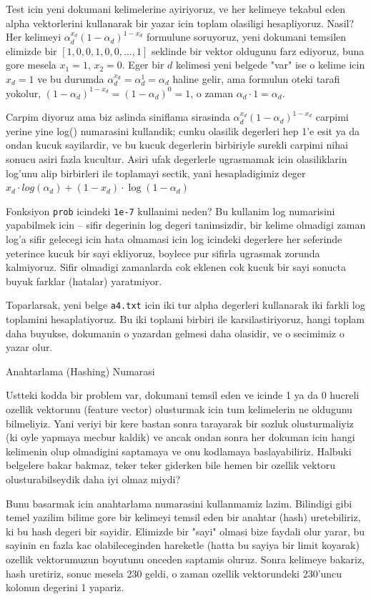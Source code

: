 \documentclass[12pt,fleqn]{article}\usepackage{../common}
\begin{document}
Test icin yeni dokumani kelimelerine ayiriyoruz, ve her kelimeye tekabul eden
alpha vektorlerini kullanarak bir yazar icin toplam olasiligi
hesapliyoruz. Nasil? Her kelimeyi $\alpha_d^{x_d}(1-\alpha_d)^{1-x_d}$ formulune
soruyoruz, yeni dokumani temsilen elimizde bir $[1,0,0,1,0,0,...,1]$ seklinde
bir vektor oldugunu farz ediyoruz, buna gore mesela $x_1=1$, $x_2=0$. Eger bir
$d$ kelimesi yeni belgede "var" ise o kelime icin $x_d = 1$ ve bu durumda
$\alpha_d^{x_d} = \alpha_d^{1} = \alpha_d$ haline gelir, ama formulun oteki
tarafi yokolur, $(1-\alpha_d)^{1-x_d} = (1-\alpha_d)^0 = 1$, o zaman $\alpha_d
\cdot 1 = \alpha_d$.

Carpim diyoruz ama biz aslinda siniflama sirasinda
$\alpha_d^{x_d}(1-\alpha_d)^{1-x_d}$ carpimi yerine yine log() numarasini
kullandik; cunku olasilik degerleri hep 1'e esit ya da ondan kucuk sayilardir,
ve bu kucuk degerlerin birbiriyle surekli carpimi nihai sonucu asiri fazla
kucultur. Asiri ufak degerlerle ugrasmamak icin olasiliklarin log'unu alip
birbirleri ile toplamayi sectik, yani hesapladigimiz deger $x_d \cdot
log(\alpha_d) + (1-x_d) \cdot \log(1-\alpha_d)$

Fonksiyon \verb!prob! icindeki \verb!1e-7! kullanimi neden? Bu
kullanim log numarisini yapabilmek icin -- sifir degerinin log degeri
tanimsizdir, bir kelime olmadigi zaman log'a sifir gelecegi icin hata
olmamasi icin log icindeki degerlere her seferinde yeterince kucuk bir
sayi ekliyoruz, boylece pur sifirla ugrasmak zorunda kalmiyoruz. Sifir
olmadigi zamanlarda cok eklenen cok kucuk bir sayi sonucta buyuk
farklar (hatalar) yaratmiyor.

Toparlarsak, yeni belge \verb!a4.txt! icin iki tur alpha
degerleri kullanarak iki farkli log toplamini hesaplatiyoruz. Bu iki
toplami birbiri ile karsilastiriyoruz, hangi toplam daha buyukse,
dokumanin o yazardan gelmesi daha olasidir, ve o secimimiz o yazar
olur.

Anahtarlama (Hashing) Numarasi

Ustteki kodda bir problem var, dokumani temsil eden ve icinde 1 ya da
0 hucreli ozellik vektorunu (feature vector) olusturmak icin tum
kelimelerin ne oldugunu bilmeliyiz. Yani veriyi bir kere bastan sonra
tarayarak bir sozluk olusturmaliyiz (ki oyle yapmaya mecbur kaldik) ve
ancak ondan sonra her dokuman icin hangi kelimenin olup olmadigini
saptamaya ve onu kodlamaya baslayabiliriz. Halbuki belgelere bakar
bakmaz, teker teker giderken bile hemen bir ozellik vektoru
olusturabilseydik daha iyi olmaz miydi?

Bunu basarmak icin anahtarlama numarasini kullanmamiz lazim. Bilindigi
gibi temel yazilim bilime gore bir kelimeyi temsil eden bir anahtar
(hash) uretebiliriz, ki bu hash degeri bir sayidir. Elimizde bir
"sayi" olmasi bize faydali olur yarar, bu sayinin en fazla kac
olabileceginden hareketle (hatta bu sayiya bir limit koyarak) ozellik
vektorumuzun boyutunu onceden saptamis oluruz.  Sonra kelimeye
bakariz, hash uretiriz, sonuc mesela 230 geldi, o zaman ozellik
vektorundeki 230'uncu kolonun degerini 1 yapariz. 
\end{document}

